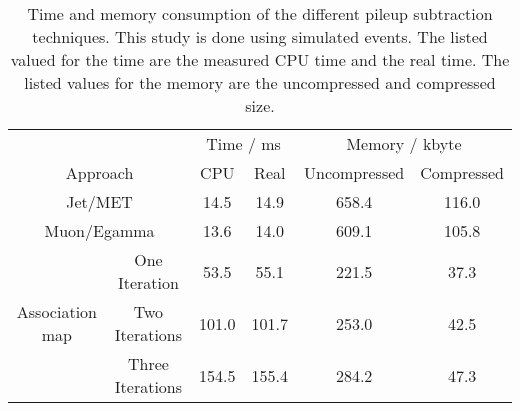 
\begin{table}[h]
    \begin{center}
        \caption[Time and memory consumption of the different pileup subtraction techniques at \ttbar{} events.]{Time and memory consumption of the different pileup subtraction techniques. This study is done using simulated \ttbar events. The listed valued for the time are the measured CPU time and the real time. The listed values for the memory are the uncompressed and compressed size.}
        \label{tab:OSPTimMemTT}
        
        \begin{tabular}{c c c c c c}
            & & \multicolumn{2}{c}{Time / ms} & \multicolumn{2}{c}{Memory / kbyte}  \\
            \multicolumn{2}{c}{Approach} & CPU & Real & Uncompressed & Compressed \\
            \midrule[2pt]
            \multicolumn{2}{c}{Jet/MET}  & 14.5 & 14.9 & 658.4  & 116.0 \\
            \midrule
            \multicolumn{2}{c}{Muon/Egamma}  & 13.6 & 14.0 & 609.1 & 105.8 \\
            \midrule
            \multirow{3}{*}{Association map}
            & One Iteration & 53.5 & 55.1 & 221.5 & 37.3 \\
            \cmidrule{2-6}
            & Two Iterations & 101.0 & 101.7 & 253.0 & 42.5 \\
            \cmidrule{2-6}
            & Three Iterations  & 154.5 & 155.4 & 284.2 & 47.3 \\
            
        \end{tabular}
        
    \end{center}
\end{table}